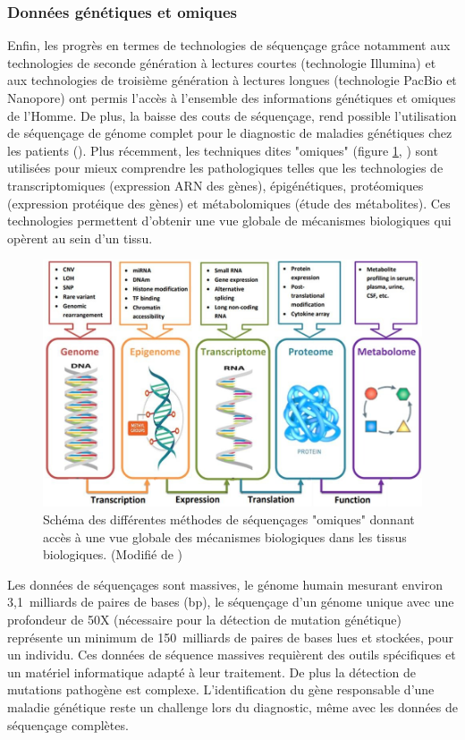 \subsubsection{Données génétiques et omiques}
Enfin, les progrès en termes de technologies de séquençage grâce notamment aux technologies de seconde génération à lectures courtes (technologie Illumina) et aux technologies de troisième génération à lectures longues (technologie PacBio et Nanopore) ont permis l'accès à l'ensemble des informations génétiques et omiques de l'Homme. De plus, la baisse des couts de séquençage, rend possible l'utilisation de séquençage de génome complet pour le diagnostic de maladies génétiques chez les patients (\cite{rabbani_next-generation_2012}). Plus récemment, les techniques dites "omiques" (figure \ref{fig:intro-omics}, \cite{momeni_survey_2020}) sont utilisées pour mieux comprendre les pathologiques telles que les technologies de transcriptomiques (expression ARN des gènes), épigénétiques, protéomiques (expression protéique des gènes) et métabolomiques (étude des métabolites). Ces technologies permettent d'obtenir une vue globale de mécanismes biologiques qui opèrent au sein d'un tissu. 
\begin{figure}[!htbp]
 \centering
 \includegraphics[width=1\textwidth]{figures/intro_omics.png}
 \caption[Méthodes de séquençages "omiques"]{Schéma des différentes méthodes de séquençages "omiques" donnant accès à une vue globale des mécanismes biologiques dans les tissus biologiques. (Modifié de \cite{momeni_survey_2020})}
 \label{fig:intro-omics}
\end{figure}
Les données de séquençages sont massives, le génome humain mesurant environ 3,1~milliards de paires de bases (bp), le séquençage d'un génome unique avec une profondeur de 50X (nécessaire pour la détection de mutation génétique) représente un minimum de 150~milliards de paires de bases lues et stockées, pour un individu. Ces données de séquence massives requièrent des outils spécifiques et un matériel informatique adapté à leur traitement. De plus la détection de mutations pathogène est complexe. L'identification du gène responsable d'une maladie génétique reste un challenge lors du diagnostic, même avec les données de séquençage complètes.

